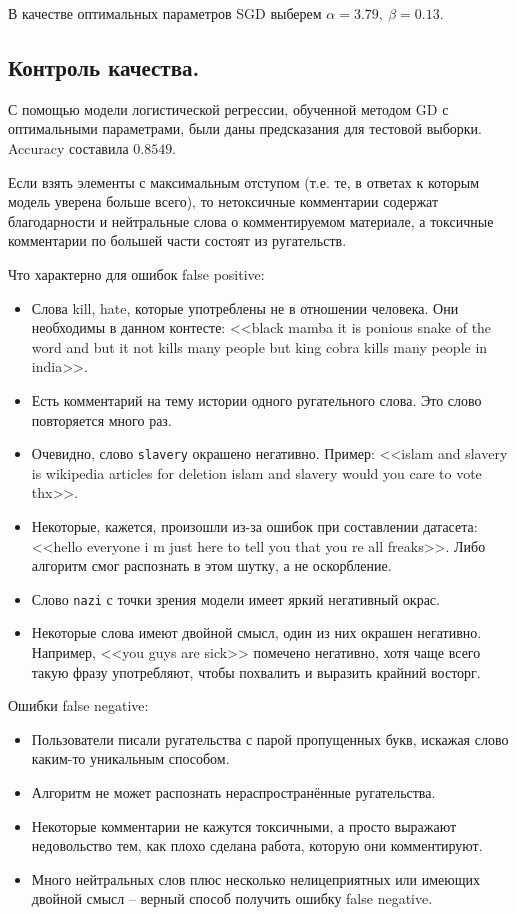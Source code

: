 \documentclass[12pt]{extarticle}
\begin{document}
В качестве оптимальных параметров SGD выберем $\alpha=3.79,\ \beta=0.13$.

\subsection{Контроль качества.}

С помощью модели логистической регрессии, обученной методом GD с оптимальными параметрами, были даны предсказания для тестовой выборки. Accuracy составила $0.8549$.

Если взять элементы с максимальным отступом (т.е. те, в ответах к которым модель уверена больше всего), то нетоксичные комментарии содержат благодарности и нейтральные слова о комментируемом материале, а токсичные комментарии по большей части состоят из ругательств.

Что характерно для ошибок false positive:
\begin{itemize}
    \item Слова kill, hate, которые употреблены не в отношении человека. Они необходимы в данном контесте: <<black mamba it is ponious snake of the word and but it not kills many people but king cobra kills many people in india>>. 
    \item Есть комментарий на тему истории одного ругательного слова. Это слово повторяется много раз.
    \item Очевидно, слово \texttt{slavery} окрашено негативно. Пример: <<islam and slavery is wikipedia articles for deletion islam and slavery would you care to vote thx>>.
    \item Некоторые, кажется, произошли из-за ошибок при составлении датасета: <<hello everyone i m just here to tell you that you re all freaks>>. Либо алгоритм смог распознать в этом шутку, а не оскорбление.
    \item Слово \texttt{nazi} с точки зрения модели имеет яркий негативный окрас.
    \item Некоторые слова имеют двойной смысл, один из них окрашен негативно. Например, <<you guys are sick>> помечено негативно, хотя чаще всего такую фразу употребляют, чтобы похвалить и выразить крайний восторг.
\end{itemize}

Ошибки false negative:
\begin{itemize}
    \item Пользователи писали ругательства с парой пропущенных букв, искажая слово каким-то уникальным способом. 
    \item Алгоритм не может распознать нераспространённые ругательства.
    \item Некоторые комментарии не кажутся токсичными, а просто выражают недовольство тем, как плохо сделана работа, которую они комментируют.
    \item Много нейтральных слов плюс несколько нелицеприятных или имеющих двойной смысл -- верный способ получить ошибку false negative.
\end{itemize}
\end{document}
